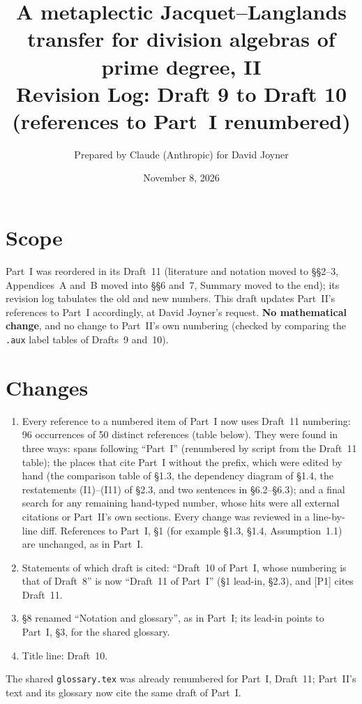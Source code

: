 \documentclass[11pt]{article}
\title{A metaplectic Jacquet--Langlands transfer for division algebras of prime degree, II\\
Revision Log: Draft 9 to Draft 10 (references to Part~I renumbered)}
\author{Prepared by Claude (Anthropic) for David Joyner}
\date{November 8, 2026}
\begin{document}
\maketitle

\section*{Scope}
Part~I was reordered in its Draft~11 (literature and notation moved to
\S\S2--3, Appendices~A and~B moved into \S\S6 and~7, Summary moved to
the end); its revision log tabulates the old and new numbers.  This
draft updates Part~II's references to Part~I accordingly, at David
Joyner's request.  \textbf{No mathematical change}, and no change to
Part~II's own numbering (checked by comparing the \texttt{.aux} label
tables of Drafts~9 and~10).

\section*{Changes}
\begin{enumerate}[leftmargin=*]
\item Every reference to a numbered item of Part~I now uses Draft~11
numbering: 96 occurrences of 50 distinct references (table below).
They were found in three ways: spans following ``Part~I'' (renumbered
by script from the Draft~11 table); the places that cite Part~I
without the prefix, which were edited by hand (the comparison table
of \S1.3, the dependency diagram of \S1.4, the restatements
(I1)--(I11) of \S2.3, and two sentences in \S6.2--\S6.3); and a final
search for any remaining hand-typed number, whose hits were all
external citations or Part~II's own sections.  Every change was
reviewed in a line-by-line diff.  References to Part~I, \S1 (for
example \S1.3, \S1.4, Assumption~1.1) are unchanged, as in Part~I.
\item Statements of which draft is cited: ``Draft~10 of Part~I, whose
numbering is that of Draft~8'' is now ``Draft~11 of Part~I'' (\S1
lead-in, \S2.3), and [P1] cites Draft~11.
\item \S8 renamed ``Notation and glossary'', as in Part~I; its lead-in
points to Part~I, \S3, for the shared glossary.
\item Title line: Draft~10.
\end{enumerate}
The shared \texttt{glossary.tex} was already renumbered for Part~I,
Draft~11; Part~II's text and its glossary now cite the same draft of
Part~I.
\end{document}
